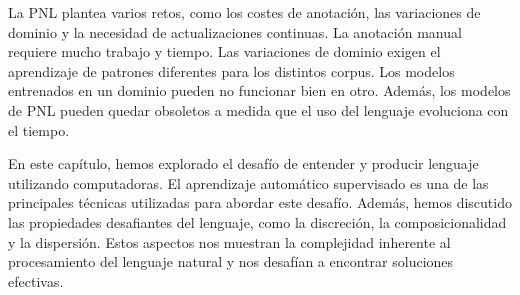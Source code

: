 \documentclass{book}
\begin{document}
La PNL plantea varios retos, como los costes de anotación, las variaciones de dominio y la necesidad de actualizaciones continuas. La anotación manual requiere mucho trabajo y tiempo. Las variaciones de dominio exigen el aprendizaje de patrones diferentes para los distintos corpus. Los modelos entrenados en un dominio pueden no funcionar bien en otro. Además, los modelos de PNL pueden quedar obsoletos a medida que el uso del lenguaje evoluciona con el tiempo.








En este capítulo, hemos explorado el desafío de entender y producir lenguaje utilizando computadoras. El aprendizaje automático supervisado es una de las principales técnicas utilizadas para abordar este desafío. Además, hemos discutido las propiedades desafiantes del lenguaje, como la discreción, la composicionalidad y la dispersión. Estos aspectos nos muestran la complejidad inherente al procesamiento del lenguaje natural y nos desafían a encontrar soluciones efectivas.





\end{document}
